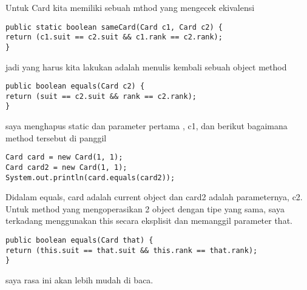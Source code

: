 Untuk Card kita memiliki sebuah mthod yang mengecek ekivalensi 
\begin{lstlisting}
public static boolean sameCard(Card c1, Card c2) {
return (c1.suit == c2.suit && c1.rank == c2.rank);
}
\end{lstlisting}

jadi yang harus kita lakukan adalah menulis kembali sebuah object method 
\begin{lstlisting}
public boolean equals(Card c2) {
return (suit == c2.suit && rank == c2.rank);
}
\end{lstlisting}

saya menghapus static dan parameter pertama , c1, dan berikut bagaimana method tersebut di panggil
\begin{lstlisting}
Card card = new Card(1, 1);
Card card2 = new Card(1, 1);
System.out.println(card.equals(card2));
\end{lstlisting}

Didalam equals, card adalah current object dan card2 adalah parameternya, c2. Untuk method yang mengoperasikan 2 object dengan tipe yang sama, saya terkadang menggunakan this secara eksplisit dan memanggil parameter that. 
\begin{lstlisting}
public boolean equals(Card that) {
return (this.suit == that.suit && this.rank == that.rank);
}
\end{lstlisting}

saya rasa ini akan lebih mudah di baca.